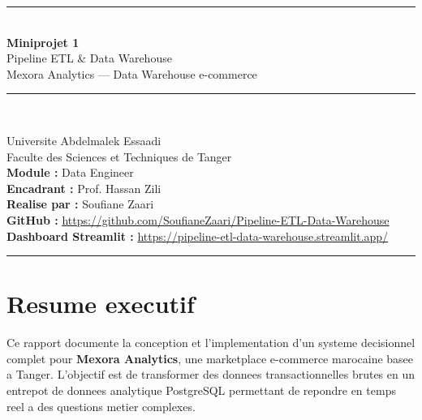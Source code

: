 \documentclass[12pt,a4paper]{article}
\begin{document}
\begin{titlepage}
\centering
\vspace*{1cm}
{\color{mexblue}\rule{\linewidth}{3pt}}\\[0.5cm]
{\Huge\bfseries\color{mexblue}Miniprojet 1}\\[0.4cm]
{\huge Pipeline ETL \& Data Warehouse}\\[0.3cm]
{\Large\color{mexgray}Mexora Analytics --- Data Warehouse e-commerce}\\[0.5cm]
{\color{mexblue}\rule{\linewidth}{1.5pt}}\\[1.5cm]

\begin{tcolorbox}[colback=mexlightblue,colframe=mexblue,width=0.85\textwidth]
\centering\large
\textbf{} Universite Abdelmalek Essaadi\\[0.25cm]
\textbf{} Faculte des Sciences et Techniques de Tanger\\[0.25cm]
\textbf{Module :} Data Engineer\\[0.25cm]
\textbf{Encadrant :} Prof. Hassan Zili\\[0.25cm]
\textbf{Realise par :} Soufiane Zaari\\[0.25cm]
\textbf{GitHub :} \url{https://github.com/SoufianeZaari/Pipeline-ETL-Data-Warehouse}\\[0.25cm]
\textbf{Dashboard Streamlit :} \url{https://pipeline-etl-data-warehouse.streamlit.app/}\\[0.25cm]
\end{tcolorbox}

\vspace{1.5cm}

\vspace{1.5cm}
\vfill
{\color{mexblue}\rule{\linewidth}{3pt}}
\end{titlepage}

\tableofcontents
\newpage

\section*{Resume executif}

Ce rapport documente la conception et l'implementation d'un systeme decisionnel complet pour
\textbf{Mexora Analytics}, une marketplace e-commerce marocaine basee a Tanger. L'objectif est
de transformer des donnees transactionnelles brutes en un entrepot de donnees analytique
PostgreSQL permettant de repondre en temps reel a des questions metier complexes.
\end{document}
